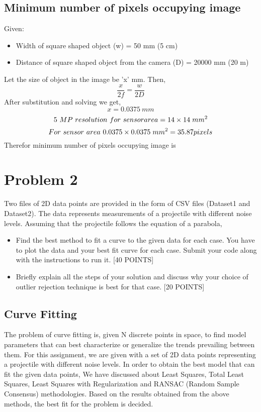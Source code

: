 \documentclass{article}
\begin{document}
\subsection{Minimum number of pixels occupying image}
Given:
\begin{itemize}
    \item Width of square shaped object (w) = 50 mm (5 cm)
    \item Distance of square shaped object from the camera (D) = 20000 mm (20 m)
\end{itemize}
Let the size of object in the image be 'x' mm. Then, 
\begin{equation}
\boxed{\frac{x}{2f}=\frac{w}{2D}}
\end{equation}
After substitution and solving we get,
\begin{equation}
\boxed{x = 0.0375 \ mm}
\end{equation}
\begin{equation}
5 \ MP \ resolution \ for \ sensor area = 14\times14\hspace{.1cm}mm ^2 \\
\end{equation}
\begin{equation}
For \ sensor \ area \ 0.0375\times0.0375\hspace{.1cm}mm ^2 = 35.87 pixels \\
\end{equation}
Therefor minimum number of pixels occupying image is 

\section{Problem 2}
Two files of 2D data points are provided in the form of CSV files (Dataset1 and Dataset2). The data represents measurements of a projectile with different noise levels. Assuming that the projectile follows the equation of a parabola,
\begin{itemize}
    \item Find the best method to fit a curve to the given data for each case. You have to plot the data and your best fit curve for each case. Submit your code along with the instructions to run it. [40 POINTS]
    \item Briefly explain all the steps of your solution and discuss why your choice of outlier rejection technique is best for that case. [20 POINTS]
\end{itemize}
\subsection{Curve Fitting}
The problem of curve fitting is, given N discrete points in space, to find model parameters that can best characterize or generalize the trends prevailing between them. For this assignment, we are given with a set of 2D data points representing a projectile with different noise levels. In order to obtain the best model that can fit the given data points, We have discussed about Least Squares, Total Least Squares, Least Squares with Regularization and RANSAC (Random Sample Consensus) methodologies. Based on the results obtained from the above methods, the best fit for the problem is decided.
\end{document}
